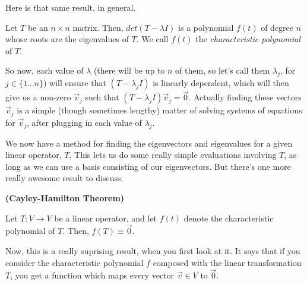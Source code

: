 \documentclass[letterpaper]{article}
\begin{document}
Here is that same result, in general. 

\begin{proposition}
Let $T$ be an $n \times n$ matrix. Then, $det(T-\lambda I)$ is a polynomial $f(t)$ of degree $n$ whose roots are the eigenvalues of $T$. We call $f(t)$ the \emph{characteristic polynomial} of $T$.
\end{proposition} 

So now, each value of $\lambda$ (there will be up to $n$ of them, so let's call them $\lambda_j$, for $j \in \{1...n\}$) will ensure that $(T-\lambda_j I)$ is linearly dependent, which will then give us a non-zero $\vec{v}_j$ such that 
$(T-\lambda_j I)\vec{v}_j=\vec{0}.$ Actually finding these vectors $\vec{v}_j$ is a simple (though sometimes lengthy) matter of solving systems of equations for $\vec{v}_j$, after plugging in each value of $\lambda_j$.

We now have a method for finding the eigenvectors and eigenvalues for a given linear operator, $T$. This lets us do some really simple evaluations involving $T$, as long as we can use a basis consisting of our eigenvectors. But there's one more really awesome result to discuss. 

\begin{theorem}
\textbf{(Cayley-Hamilton Theorem)}

Let $T:V \to V$ be a linear operator, and let $f(t)$ denote the characteristic polynomial of $T$. Then, $f(T) \equiv \vec{0}$.
\end{theorem}

Now, this is a really suprising result, when you first look at it. It says that if you consider the characteristic polynomial $f$ composed with the linear transformation $T$, you get a function which maps every vector $\vec{v} \in V$ to $\vec{0}$.
\end{document}
